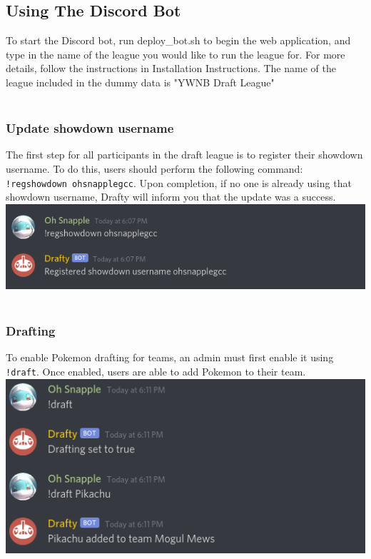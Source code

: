\documentclass{article}
\begin{document}
\subsection*{Using The Discord Bot}
To start the Discord bot, run deploy\_bot.sh to begin the web application, and type in the name of the league you would like to run the league for. 
For more details, follow the instructions in Installation Instructions. 
The name of the league included in the dummy data is "YWNB Draft League"\\\\

\subsubsection*{Update showdown username}
The first step for all participants in the draft league is to register their showdown username. 
To do this, users should perform the following command: \verb|!regshowdown ohsnapplegcc|. 
Upon completion, if no one is already using that showdown username, Drafty will inform you that the update was a success.\\
\includegraphics[scale=.5]{regshowdown.png}
\\\\
\subsubsection*{Drafting}
To enable Pokemon drafting for teams, an admin must first enable it using \verb|!draft|. 
Once enabled, users are able to add Pokemon to their team.\\
\includegraphics[scale=.5]{draft.png}
\\\\
\end{document}
